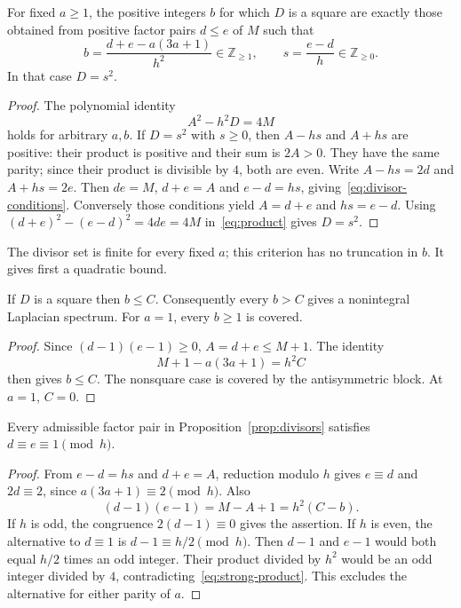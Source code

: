 \begin{proposition}
\label{prop:divisors}
For fixed $a\geq1$, the positive integers $b$ for which $D$ is a square
are exactly those obtained from positive factor pairs $d\leq e$ of $M$
such that
\begin{equation}
\label{eq:divisor-conditions}
b=\frac{d+e-a(3a+1)}{h^2}\in\mathbb Z_{\geq1},\qquad
s=\frac{e-d}{h}\in\mathbb Z_{\geq0}.
\end{equation}
In that case $D=s^2$.
\end{proposition}
\begin{proof}
The polynomial identity
\begin{equation}
\label{eq:product}
A^2-h^2D=4M
\end{equation}
holds for arbitrary $a,b$. If $D=s^2$ with $s\geq0$, then
$A-hs$ and $A+hs$ are positive: their product is positive and their sum
is $2A>0$. They have the same parity; since their product is divisible
by $4$, both are even. Write $A-hs=2d$ and $A+hs=2e$.
Then $de=M$, $d+e=A$ and $e-d=hs$, giving~\eqref{eq:divisor-conditions}.
Conversely those conditions yield $A=d+e$ and $hs=e-d$.
Using $(d+e)^2-(e-d)^2=4de=4M$ in~\eqref{eq:product} gives $D=s^2$.
\end{proof}

The divisor set is finite for every fixed $a$; this criterion has no
truncation in $b$. It gives first a quadratic bound.

\begin{corollary}
\label{cor:quadratic}
If $D$ is a square then $b\leq C$. Consequently every $b>C$ gives
a nonintegral Laplacian spectrum. For $a=1$, every $b\geq1$ is covered.
\end{corollary}
\begin{proof}
Since $(d-1)(e-1)\geq0$, $A=d+e\leq M+1$. The identity
\[
M+1-a(3a+1)=h^2C
\]
then gives $b\leq C$. The nonsquare case is covered by the antisymmetric
block. At $a=1$, $C=0$.
\end{proof}

\begin{lemma}
\label{lem:congruence}
Every admissible factor pair in Proposition~\ref{prop:divisors} satisfies
$d\equiv e\equiv1\pmod h$.
\end{lemma}
\begin{proof}
From $e-d=hs$ and $d+e=A$, reduction modulo $h$ gives
$e\equiv d$ and $2d\equiv2$, since $a(3a+1)\equiv2\pmod h$.
Also
\begin{equation}
\label{eq:strong-product}
(d-1)(e-1)=M-A+1=h^2(C-b).
\end{equation}
If $h$ is odd, the congruence $2(d-1)\equiv0$ gives the assertion.
If $h$ is even, the alternative to $d\equiv1$ is
$d-1\equiv h/2\pmod h$. Then $d-1$ and $e-1$ would both equal
$h/2$ times an odd integer. Their product divided by $h^2$ would be an
odd integer divided by $4$, contradicting~\eqref{eq:strong-product}.
This excludes the alternative for either parity of $a$.
\end{proof}

